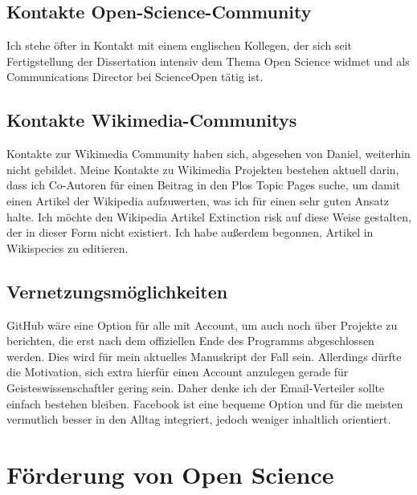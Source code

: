 \documentclass[11pt,a4paper]{article}
\begin{document}
\subsection{Kontakte Open-Science-Community}%
Ich stehe öfter in Kontakt mit einem englischen Kollegen, der sich seit Fertigstellung der Dissertation intensiv dem Thema Open Science widmet und als Communications Director bei ScienceOpen tätig ist.


\subsection{Kontakte Wikimedia-Communitys}%
Kontakte zur Wikimedia Community haben sich, abgesehen von Daniel, weiterhin nicht gebildet. Meine Kontakte zu Wikimedia Projekten bestehen aktuell darin, dass ich Co-Autoren für einen Beitrag in den Plos Topic Pages suche, um damit einen Artikel der Wikipedia aufzuwerten, was ich für einen sehr guten Ansatz halte. Ich möchte den Wikipedia Artikel Extinction risk auf diese Weise gestalten, der in dieser Form nicht existiert. Ich habe außerdem begonnen, Artikel in Wikispecies zu editieren.

\subsection{Vernetzungsmöglichkeiten} %
GitHub wäre eine Option für alle mit Account, um auch noch über Projekte zu berichten, die erst nach dem offiziellen Ende des Programms abgeschlossen werden. Dies wird für mein aktuelles Manuskript der Fall sein. Allerdings dürfte die Motivation, sich extra hierfür einen Account anzulegen gerade für Geisteswissenschaftler gering sein. Daher denke ich der Email-Verteiler sollte einfach bestehen bleiben. Facebook ist eine bequeme Option und für die meisten vermutlich besser in den Alltag integriert, jedoch weniger inhaltlich orientiert. 





\section{Förderung von Open Science} %
\end{document}

